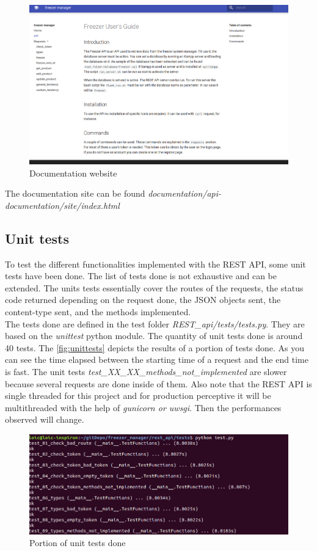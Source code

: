 \begin{figure}[H]
\centering
\includegraphics[scale=0.25]{./images/documentation.png}
\caption{Documentation website}
\label{fig:adminPanel}
\end{figure}

The documentation site can be found \textit{documentation/api-documentation/site/index.html}

\subsection{Unit tests}
To test the different functionalities implemented with the REST API, some unit tests have been done. The list of tests done is not exhaustive and can be extended. The units tests essentially cover the routes of the requests, the status code returned depending on the request done, the JSON objects sent, the content-type sent, and the methods implemented.\\

The tests done are defined in the test folder \textit{REST\_api/tests/tests.py}. They are based on the \textit{unittest} python module. The quantity of unit tests done is around 40 tests. The \autoref{fig:unittests} depicts the results of a portion of tests done. As you can see the time elapsed between the starting time of a request and the end time is fast. The unit tests \textit{test\_XX\_XX\_methods\_not\_implemented} are slower because several requests are done inside of them. Also note that the REST API is single threaded for this project and for production perceptive it will be multithreaded with the help of \textit{gunicorn or uwsgi}. Then the performances observed will change.
\begin{figure}[H]
\centering
\includegraphics[scale=0.4]{./images/unittests.png}
\caption{Portion of unit tests done}
\label{fig:unittests}
\end{figure}

